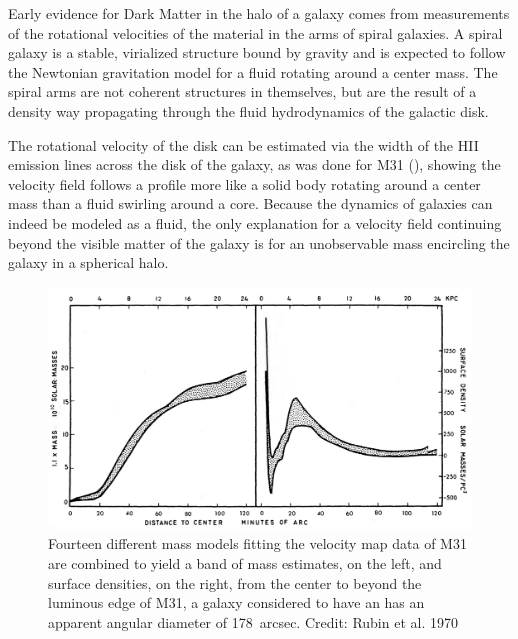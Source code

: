\documentclass{paper}
\begin{document}
  Early evidence for Dark Matter in the halo of a galaxy comes from
  measurements of the rotational velocities of the material in the arms of
  spiral galaxies. A spiral galaxy is a stable, virialized structure bound by
  gravity and is expected to follow the Newtonian gravitation model for a
  fluid rotating around a center mass. The spiral arms are not coherent
  structures in themselves, but are the result of a density way propagating 
  through the fluid hydrodynamics of the galactic disk. 

  The rotational velocity of the disk can be estimated via the 
  width of the HII emission lines across the disk of the galaxy, as was done
  for M31 (\cite{1970ApJ...159..379R}), showing the velocity field follows a 
  profile more like a solid body rotating around a center mass than a fluid 
  swirling around a core. Because the dynamics of galaxies can indeed be 
  modeled as a fluid, the only explanation for a velocity field continuing 
  beyond the visible matter of the galaxy is for an unobservable mass 
  encircling the galaxy in a spherical halo.

  \begin{figure}[!htb]
    \begin{centering}
    \includegraphics[scale=0.4]{DM-masscurve.pdf}
    \caption{Fourteen different mass models fitting the velocity map data of
      M31 are combined to yield a band of mass estimates, on the left, and 
      surface densities, on the right, from the center to beyond the luminous 
      edge of M31, a galaxy considered to have an has an apparent angular 
      diameter of \SI{178}{arcsec}.
    Credit: Rubin et al. 1970}
    \label{fig:DM-masscurve}
    \end{centering}
  \end{figure}
\end{document}
